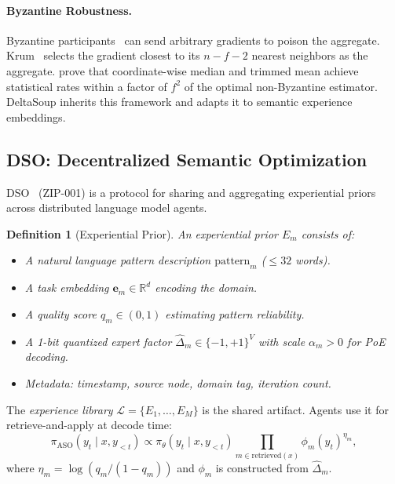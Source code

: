 \documentclass[11pt]{article}
\newtheorem{definition}{Definition}
\begin{document}
\paragraph{Byzantine Robustness.}
Byzantine participants~\cite{lamport1982byzantine} can send arbitrary
gradients to poison the aggregate. Krum~\cite{blanchard2017machine} selects the
gradient closest to its $n - f - 2$ nearest neighbors as the aggregate.
\cite{yin2018byzantine} prove that coordinate-wise median and trimmed mean
achieve statistical rates within a factor of $f^2$ of the optimal non-Byzantine
estimator. DeltaSoup inherits this framework and adapts it to semantic
experience embeddings.

\subsection{DSO: Decentralized Semantic Optimization}

DSO~\cite{hanzo2026dso} (ZIP-001) is a protocol for sharing and aggregating
experiential priors across distributed language model agents.

\begin{definition}[Experiential Prior]
\label{def:prior}
An experiential prior $E_m$ consists of:
\begin{itemize}[leftmargin=1.5em]
    \item A natural language pattern description $\text{pattern}_m$ ($\leq 32$ words).
    \item A task embedding $\bm{e}_m \in \mathbb{R}^d$ encoding the domain.
    \item A quality score $q_m \in (0, 1)$ estimating pattern reliability.
    \item A 1-bit quantized expert factor $\widehat{\Delta}_m \in \{-1,+1\}^V$
          with scale $\alpha_m > 0$ for PoE decoding.
    \item Metadata: timestamp, source node, domain tag, iteration count.
\end{itemize}
\end{definition}

The \emph{experience library} $\mathcal{L} = \{E_1, \ldots, E_M\}$ is the
shared artifact. Agents use it for retrieve-and-apply at decode time:
\begin{equation}
    \pi_{\text{ASO}}(y_t \mid x, y_{<t}) \propto \pi_\theta(y_t \mid x, y_{<t})
    \prod_{m \in \text{retrieved}(x)} \phi_m(y_t)^{\eta_m},
    \label{eq:poe}
\end{equation}
where $\eta_m = \log(q_m / (1 - q_m))$ and $\phi_m$ is constructed from
$\widehat{\Delta}_m$.
\end{document}
